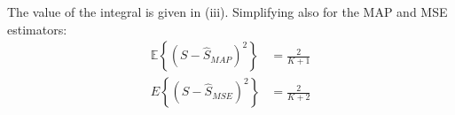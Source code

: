 \begin{solution}
\begin{itemize}
%        
        
    
    The value of the integral is given in (iii). Simplifying also for the MAP and MSE estimators:
    \begin{align}
        \mathbb{E}\left\{ (S-\hat{S}_{MAP})^2\right\} & = \displaystyle\frac{2}{K+1}  \nonumber \\
        {E}\left\{(S-\hat{S}_{MSE})^2\right\} & = \displaystyle\frac{2}{K+2}  \nonumber 
    \end{align}


    
\end{itemize}
\end{solution}